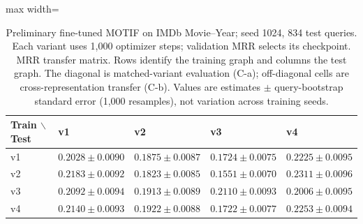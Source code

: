 \begin{table}[htbp]
\centering
\small
\renewcommand{\arraystretch}{1.15}
\setlength{\tabcolsep}{5pt}
\begin{adjustbox}{max width=\linewidth}
\begin{tabular}{|l|l|l|l|l|}
\hline
\textbf{Train $\backslash$ Test} & \textbf{v1} & \textbf{v2} & \textbf{v3} & \textbf{v4} \\
\hline
v1 & $0.2028 \pm 0.0090$ & $0.1875 \pm 0.0087$ & $0.1724 \pm 0.0075$ & $0.2225 \pm 0.0095$ \\
\hline
v2 & $0.2183 \pm 0.0092$ & $0.1823 \pm 0.0085$ & $0.1551 \pm 0.0070$ & $0.2311 \pm 0.0096$ \\
\hline
v3 & $0.2092 \pm 0.0094$ & $0.1913 \pm 0.0089$ & $0.2110 \pm 0.0093$ & $0.2006 \pm 0.0095$ \\
\hline
v4 & $0.2140 \pm 0.0093$ & $0.1922 \pm 0.0088$ & $0.1722 \pm 0.0077$ & $0.2253 \pm 0.0094$ \\
\hline
\end{tabular}
\end{adjustbox}
\caption{Preliminary fine-tuned MOTIF on IMDb Movie--Year; seed 1024, 834 test queries. Each variant uses 1,000 optimizer steps; validation MRR selects its checkpoint. MRR transfer matrix. Rows identify the training graph and columns the test graph. The diagonal is matched-variant evaluation (C-a); off-diagonal cells are cross-representation transfer (C-b). Values are estimates $\pm$ query-bootstrap standard error (1,000 resamples), not variation across training seeds.}
\label{tab:motif-imdb-movie-year-matrix-transfer-mrr}
\end{table}
